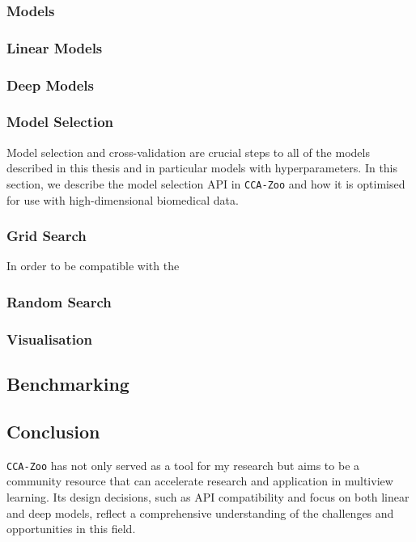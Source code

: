 \subsubsection{Models}

\subsubsection{Linear Models}

\subsubsection{Deep Models}


\subsubsection{Model Selection}

Model selection and cross-validation are crucial steps to all of the models described in this thesis and in particular models with hyperparameters.
In this section, we describe the model selection API in \texttt{CCA-Zoo} and how it is optimised for use with high-dimensional biomedical data.

\subsubsection{Grid Search}

In order to be compatible with the

\subsubsection{Random Search}

\subsubsection{Visualisation}

\subsection{Benchmarking}


\subsection{Conclusion}

\texttt{CCA-Zoo} has not only served as a tool for my research but aims to be a community resource that can accelerate research and application in multiview learning.
Its design decisions, such as API compatibility and focus on both linear and deep models, reflect a comprehensive understanding of the challenges and opportunities in this field.
